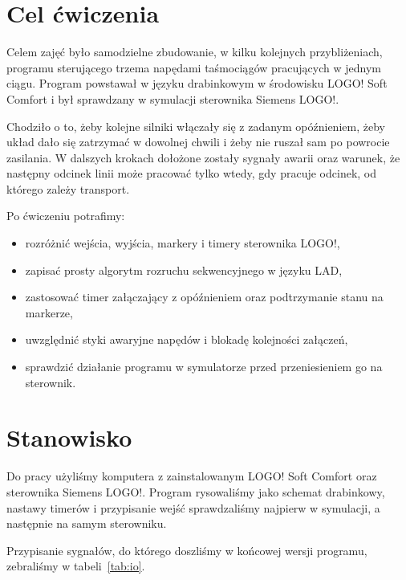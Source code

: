 \section{Cel ćwiczenia}

Celem zajęć było samodzielne zbudowanie, w kilku kolejnych przybliżeniach, programu sterującego trzema napędami taśmociągów pracujących w jednym ciągu. Program powstawał w języku drabinkowym w środowisku LOGO! Soft Comfort i był sprawdzany w symulacji sterownika Siemens LOGO!.

Chodziło o to, żeby kolejne silniki włączały się z zadanym opóźnieniem, żeby układ dało się zatrzymać w dowolnej chwili i żeby nie ruszał sam po powrocie zasilania. W dalszych krokach dołożone zostały sygnały awarii oraz warunek, że następny odcinek linii może pracować tylko wtedy, gdy pracuje odcinek, od którego zależy transport.

Po ćwiczeniu potrafimy:

\begin{itemize}
    \item rozróżnić wejścia, wyjścia, markery i timery sterownika LOGO!,
    \item zapisać prosty algorytm rozruchu sekwencyjnego w języku LAD,
    \item zastosować timer załączający z opóźnieniem oraz podtrzymanie stanu na markerze,
    \item uwzględnić styki awaryjne napędów i blokadę kolejności załączeń,
    \item sprawdzić działanie programu w symulatorze przed przeniesieniem go na sterownik.
\end{itemize}

\section{Stanowisko}

Do pracy użyliśmy komputera z zainstalowanym LOGO! Soft Comfort oraz sterownika Siemens LOGO!. Program rysowaliśmy jako schemat drabinkowy, nastawy timerów i przypisanie wejść sprawdzaliśmy najpierw w symulacji, a następnie na samym sterowniku.

Przypisanie sygnałów, do którego doszliśmy w końcowej wersji programu, zebraliśmy w tabeli~\ref{tab:io}.

